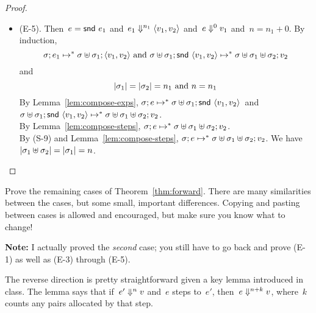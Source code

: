 \documentclass{article}
\begin{document}
\begin{proof}
\begin{itemize}
\item (E-5).
    Then~$e = \kwsnd{e_1}$
    and~$\eval[n_1]{e_1}{\kwvpair{v_1}{v_2}}$
    and~$\eval[0]{e}{v_1}$
    and~$n = n_1 + 0$.
    By induction,
    \[
    \cfg{\store}{e_1} \step^* \cfg{\stjoin{\store}{\store_1}}{\kwvpair{v_1}{v_2}}
    \text{~and~}
    \cfg{\stjoin{\store}{\store_1}}{\kwsnd{\kwvpair{v_1}{v_2}}} 
        \step^* 
        \cfg{\stjoin{\stjoin{\store}{\store_1}}{\store_2}}{v_2}
    \]
    and
    \[|\store_1| = |\store_2| = n_1 \text{~and~} n = n_1 \]
    By Lemma~\ref{lem:compose-exps},
    $
        \cfg{\store}{e} \step^* \cfg{\stjoin{\store}{\store_1}}{\kwsnd{\kwvpair{v_1}{v_2}}}
    $~and~$
        \cfg{\stjoin{\store}{\store_1}}{\kwsnd{\kwvpair{v_1}{v_2}}} 
        \step^* 
        \cfg{\stjoin{\stjoin{\store}{\store_1}}{\store_2}}{v_2}
    $.\\
    By Lemma~\ref{lem:compose-steps},
      $\cfg{\store}{e} \step^*
        \cfg{\stjoin{\stjoin{\store}{\store_1}}{\store_2}}{v_2}$.\\
    By (S-9) and Lemma~\ref{lem:compose-steps},
      $\cfg{\store}{e} \step^*
      \cfg{\stjoin{\stjoin{\store}{\store_1}}{\store_2}}{v_2}$.
          We have
      $|\stjoin{\store_1}{\store_2}| =
      |\store_1| = n$.

  \end{itemize}
\end{proof}

\begin{task}
  Prove the remaining cases of Theorem~\ref{thm:forward}.
  There are many similarities between the cases, but some small, important
  differences. Copying and pasting between cases is allowed and encouraged,
  but make sure you know what to change!

  \textbf{Note:} I actually proved the {\em second} case; you still have
  to go back and prove (E-1) as well as (E-3) through (E-5).
\end{task}

The reverse direction is pretty straightforward given a key lemma introduced
in class.
%
The lemma says that if~$\eval[n]{e'}{v}$ and~$e$ steps to~$e'$,
then~$\eval[n+k]{e}{v}$, where~$k$ counts any pairs allocated by that step.
\end{document}
